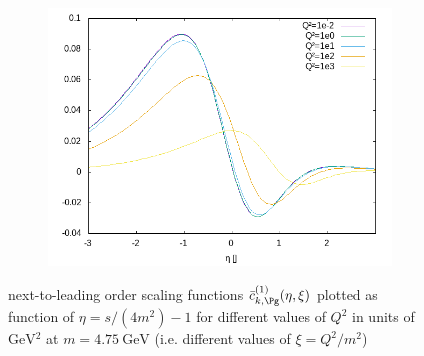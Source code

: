 \begin{figure}[ht!]
\begin{subfigure}[t]{.3\textwidth}
\end{subfigure}%
\begin{subfigure}[t]{.3\textwidth}
	\includegraphics[width=\textwidth]{../../img2/partonic/cgBar1_AA_x2g1}
\end{subfigure}%
\caption{next-to-leading order scaling functions $\bar c_{k,\Pg}^{(1)}(\eta,\xi)$ plotted as function of $\eta=s/(4m^2)-1$ for different values of $Q^2$ in units of $\si{\GeV^2}$ at $m=\SI{4.75}{\GeV}$ (i.e. different values of $\xi=Q^2/m^2$) }\label{fig:cgBar1}
\end{figure}

